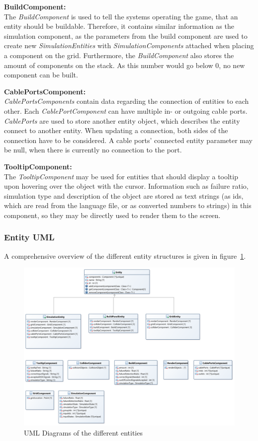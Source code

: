 \textbf{BuildComponent:} \\
The \textit{BuildComponent} is used to tell the systems operating the game, that an entity should be buildable.
Therefore, it contains similar information as the simulation component, as the parameters from the build component are used
to create new \textit{SimulationEntities} with \textit{SimulationComponents} attached when placing a component on the grid.
Furthermore, the \textit{BuildComponent} also stores the amount of components on the stack.
As this number would go below 0, no new component can be built.

\textbf{CablePortsComponent:} \\
\textit{CablePortsComponents} contain data regarding the connection of entities to each other.
Each \textit{CablePortComponent} can have multiple in- or outgoing cable ports.
\textit{CablePorts} are used to store another entity object, which describes the entity connect to another entity.
When updating a connection, both sides of the connection have to be considered.
A cable ports' connected entity parameter may be null, when there is currently no connection to the port.

\textbf{TooltipComponent:} \\
The \textit{TooltipComponent} may be used for entities that should display a tooltip upon hovering over the object with the cursor.
Information such as failure ratio, simulation type and description of the object are stored as text strings (as ids, which are read
from the language file, or as converted numbers to strings) in this component, so they may be directly used to render them to
the screen.
\subsubsection{Entity UML}\label{subsubsec:entity-uml}
A comprehensive overview of the different entity structures is given in figure~\ref{fig:entities}.
\begin{figure}
    \centering
    \includegraphics[width=\textwidth]{Pictures/res/implementation/entities}
    \caption{UML Diagrams of the different entities}
    \label{fig:entities}
\end{figure}
